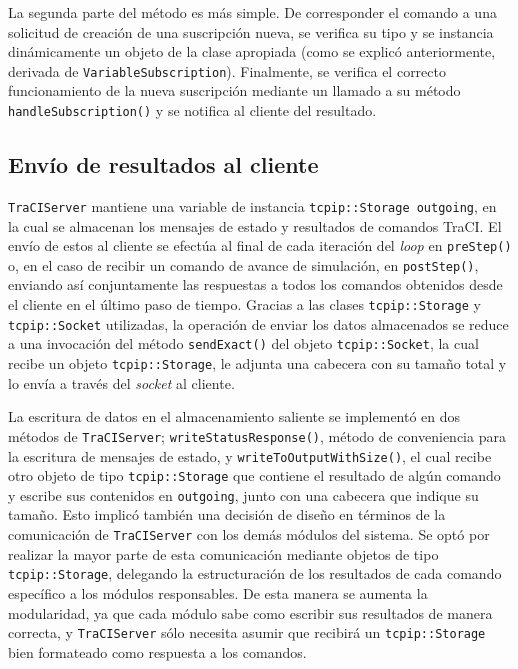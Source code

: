 La segunda parte del método es más simple. De corresponder el comando a una solicitud de creación de una suscripción nueva, se verifica su tipo y se instancia dinámicamente un objeto de la clase apropiada (como se explicó anteriormente, derivada de \texttt{VariableSubscription}). Finalmente, se verifica el correcto funcionamiento de la nueva suscripción mediante un llamado a su método \texttt{handleSubscription()} y se notifica al cliente del resultado.


    
%    

\subsection{Envío de resultados al cliente}

\texttt{TraCIServer} mantiene una variable de instancia \texttt{tcpip::Storage outgoing}, en la cual se almacenan los mensajes de estado y resultados de comandos TraCI. El envío de estos al cliente se efectúa al final de cada iteración del \emph{loop} en \texttt{preStep()} o, en el caso de recibir un comando de avance de simulación, en \texttt{postStep()}, enviando así conjuntamente las respuestas a todos los comandos obtenidos desde el cliente en el último paso de tiempo. Gracias a las clases \texttt{tcpip::Storage} y \texttt{tcpip::Socket} utilizadas, la operación de enviar los datos almacenados se reduce a una invocación del método \texttt{sendExact()} del objeto \texttt{tcpip::Socket}, la cual recibe un objeto \texttt{tcpip::Storage}, le adjunta una cabecera con su tamaño total y lo envía a través del \emph{socket} al cliente.

La escritura de datos en el almacenamiento saliente se implementó en dos métodos de \texttt{TraCIServer}; \texttt{writeStatusResponse()}, método de conveniencia para la escritura de mensajes de estado, y \texttt{writeToOutputWithSize()}, el cual recibe otro objeto de tipo \texttt{tcpip::Storage} que contiene el resultado de algún comando y escribe sus contenidos en \texttt{outgoing}, junto con una cabecera que indique su tamaño. Esto implicó también una decisión de diseño en términos de la comunicación de \texttt{TraCIServer} con los demás módulos del sistema. Se optó por realizar la mayor parte de esta comunicación mediante objetos de tipo \texttt{tcpip::Storage}, delegando la estructuración de los resultados de cada comando específico a los módulos responsables. De esta manera se aumenta la modularidad, ya que cada módulo sabe como escribir sus resultados de manera correcta, y \texttt{TraCIServer} sólo necesita asumir que recibirá un \texttt{tcpip::Storage} bien formateado como respuesta a los comandos.

